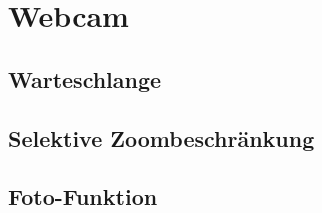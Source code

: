 \section{Webcam}


\subsection{Warteschlange}



\subsection{Selektive Zoombeschränkung}



\subsection{Foto-Funktion}
